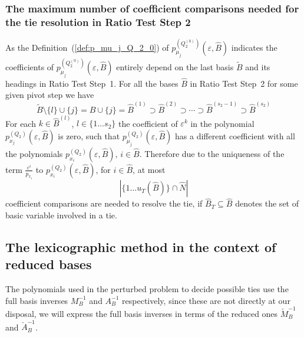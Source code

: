 \documentclass[a4paper]{article}
\newcommand{\pmu}[2]{\ensuremath{p_{\mu_{j}}^{(#1)}(\varepsilon, #2)}}
\begin{document}
\subsubsection{The maximum number of coefficient comparisons needed for the tie
resolution in Ratio Test Step 2}
As the Definition~(\ref{def:p_mu_j_Q_2_0}) of
\pmu{Q_{2}^{(0)}}{\hat{B}} indicates
the coefficients of \pmu{Q_{2}^{(0)}}{\hat{B}} entirely depend
on the last basis $\tilde{B}$ and its headings in Ratio Test Step~1.
For all the bases
$\hat{B}$ in Ratio Test Step~2 for some given pivot step we have
\begin{equation}
\label{eq:B_hat_inclusion}
\tilde{B} \setminus \{l\} \cup \{j\} =
B \cup \{j\} =
\hat{B}^{(1)} \supset \hat{B}^{(2)} \supset \cdots \supset \hat{B}^{(s_{2}-1)}
\supset \hat{B}^{(s_{2})}
\end{equation}
For each $k \in \hat{B}^{(l)}$, $l \in \{1 \dots s_{2}\}$ the coefficient of
$\varepsilon^{k}$ in the polynomial
$p_{x_{j}}^{(Q_{2})}(\varepsilon, \hat{B})$ is zero, such that
\pmu{Q_{2}}{\hat{B}} has a different coefficient with all
the polynomials $p_{x_{i}}^{(Q_2)}(\varepsilon, \hat{B})$, $i \in \hat{B}$.
Therefore due to the uniqueness of the term $\frac{\varepsilon^{i}}{p_{x_{i}}}$
to $p_{x_{i}}^{(Q_2)}(\varepsilon, \hat{B})$, for $i \in \hat{B}$, at most 
\begin{equation}
\label{eq:max_varepsilon_exp_Q_2}
\left|\{1 \ldots u_{T}(\hat{B})\} \cap \hat{N}\right|
\end{equation}
coefficient comparisons are needed to resolve the tie, if
$\hat{B}_{T} \subseteq \hat{B}$ denotes the set of basic variable involved in a
tie. 
\subsection{The lexicographic method in the context of reduced bases}
The polynomials used in the perturbed problem to decide possible ties use
the full basis inverses $M_{B}^{-1}$ and $A_{B}^{-1}$ respectively, since these
are not directly at our disposal, we will express the full basis inverses in
terms of the reduced ones $\check{M}_{B}^{-1}$ and $\check{A}_{B}^{-1}$.
\end{document}
